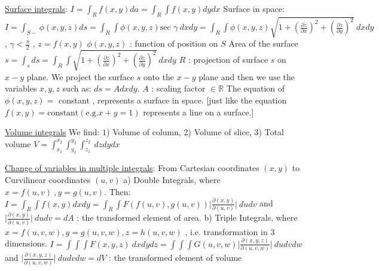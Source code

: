 \documentclass[12pt]{article}
\def\sec{\text{sec\ }} %
\begin{document}
\begin{flushleft}
	\textbullet \quad \uline{Surface integrals}: $\displaystyle I = \int_R f(x,y) da = \int_R \int f(x,y) dy dx $ \linebreak 
	\textbullet \quad Surface in space: $\displaystyle I= \int_{S-} \phi (x,y,z) ds = \int_R \int \phi (x,y,z) \sec \gamma \ dx dy = \int_R \int \phi (x,y,z) \sqrt{1+ \left( \frac{\partial z}{\partial x} \right)^2 + \left( \frac{\partial z}{\partial y} \right)^2 } \ dx dy \ $, $\gamma < \frac{\pi}{2} $ , $z = f(x,y)$ \linebreak 
	$\phi(x,y,z)$  :  function of position on $S$ \linebreak 
	Area of the surface $\displaystyle s = \int_s ds = \int_R \int \sqrt{1 + \left( \frac{\partial z}{\partial x} \right)^2 + \left( \frac{\partial z}{\partial y}\right)^2 } \ dx dy$ \linebreak 
	$R$  :  projection of surface $s$ on $x-y$ plane. \linebreak 
	\textbullet \quad We project the surface $s$ onto the $x-y$ plane and then we use the variables $x,y,z$ such as: $\displaystyle ds = Adx dy$. $A$  :  scaling factor $\in \mathbb{R}$ \linebreak 
	\textbullet \quad The equation of $\phi (x,y,z) = $ constant  ,  represents a surface in space. [just like the equation $\displaystyle f(x,y) = \text{constant} (\text{e.g.} x+y=1)$ represents a line on a surface.] \linebreak 
	
	\textbullet \quad \uline{Volume integrals} \linebreak 
	We find: $1$) Volume of column, $2$) Volume of slice, $3$) Total volume \linebreak 
	\textbullet \quad $\displaystyle V = \int_{x_1}^{x_2} \int_{y_1}^{y_2} \int_{z_1}^{z_2} \ dz dy dx$ \linebreak 
	
	\textbullet \quad \uline{Change of variables in multiple integrals}: From Cartesian coordinates $(x,y)$ to Curvilinear coordinates $(u,v)$ \linebreak 
	a) Double Integrals, where $x=f(u,v) \ , y = g(u,v)$. Then: \linebreak 
	$\displaystyle I = \int_R \int f(x,y) dx dy = \int_R \int F\left( f(u,v) , g(u,v) \right) \big| \frac{\partial (x,y)}{\partial (u,v)} \big| \ du dv$ \linebreak 
	and $\displaystyle \big| \frac{\partial (x,y)}{\partial (u,v)} \big| \ du dv = dA$  :  the transformed element of area. \linebreak 
	b) Triple Integrals, where $x= f(u,v,w), y = g(u,v,w), z = h(u,v,w)$ , i.e. transformation in $3$ dimensions. \linebreak 
	$\displaystyle I= \int \int \int F(x,y,z) \ dx dy dz = \int \int \int G(u,v,w) \big| \frac{\partial (x,y,z)}{\partial (u,v,w)} \big| \ du dv dw$ \linebreak 
	and $\displaystyle  \big| \frac{\partial (x,y,z)}{\partial (u,v,w)} \big| \ du dv dw = dV$  :  the transformed element of volume \linebreak 
	

\end{flushleft}
\end{document}
